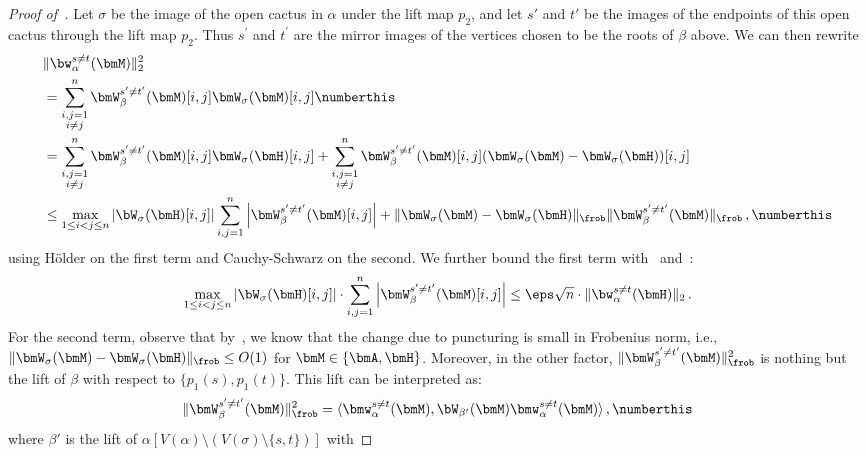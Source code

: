 \begin{proof}[Proof of~]
    Let $\sigma$ be the image of the open cactus in
    $\alpha$ under the lift map $p_2$, and let $s'$ and $t'$ be the images
    of the endpoints of this open cactus through the lift map $p_2$.
    Thus $s^{\prime}$ and $t^{\prime}$ are the mirror images of the vertices chosen to be the roots of $\beta$ above.
     We can then rewrite
    \begin{align*}
        &\|\bw^{s\neq t}_\alpha(\bmM)\|_2^2 \\
        &= \sum_{\substack{i,j=1\\i\neq j}}^n  \bmW_\beta^{s'\neq t'}(\bmM)[i,j] \bmW_\sigma(\bmM)[i,j]\numberthis \label{eq:lift-proof1}\\
            &= \sum_{\substack{i,j=1\\i\neq j}}^n  \bmW_\beta^{s'\neq t'}(\bmM)[i,j]   \bmW_\sigma(\bmH)[i,j] +  \sum_{\substack{i,j=1\\i\neq j}}^n  \bmW_\beta^{s'\neq t'}(\bmM)[i,j]  (\bmW_\sigma(\bmM) - \bmW_\sigma(\bmH))[i,j]\\
            &\le \max_{1\le i<j\le n} \left|\bW_\sigma(\bmH)[i,j]\right| \sum_{i,j=1}^n \left|\bmW_\beta^{s'\neq t'}(\bmM)[i,j]\right| + \|\bmW_\sigma(\bmM) - \bmW_\sigma(\bmH)\|_{\frob}  \|\bmW_\beta^{s'\neq t'}(\bmM)\|_{\frob}\,, \numberthis\label{eq:lift-proof2}
    \end{align*}
    using H{\"o}lder on the first term 
    and Cauchy-Schwarz on the second.
    We further bound the first term with~ and~:
    \[
        \max_{1\le i<j\le n} \left|\bW_\sigma(\bmH)[i,j]\right|\cdot \sum_{i,j=1}^n \left|\bmW_\beta^{s'\neq t'}(\bmM)[i,j]\right|\le \eps \sqrt n \cdot \|\bw_\alpha^{s\neq t}(\bmH)\|_2\,.
    \]
    For the second term, observe that
    by~, we know that
    the change due to puncturing is small in Frobenius norm, i.e.,
    $\|\bmW_\sigma(\bmM) - \bmW_\sigma(\bmH)\|_{\frob}\le O(1)$ for $\bmM\in \{\bmA, \bmH\}$. Moreover, in the other factor,
    $\|\bmW_\beta^{s'\neq t'}(\bmM)\|_{\frob}^2$
    is nothing but the lift of $\beta$ with
    respect to $\{p_1(s), p_1(t)\}$. This lift
    can be interpreted as:
    \begin{align*}
        \|\bmW_\beta^{s'\neq t'}(\bmM)\|_{\frob}^2 = \langle \bmw_\alpha^{s\neq t}(\bmM), \bW_{\beta'} (\bmM) \bmw_\alpha^{s\neq t}(\bmM)\rangle\,, \numberthis\label{eq:lift-proof3}
    \end{align*}
    where $\beta'$ is the lift of 
    $\alpha\left[V(\alpha)\setminus (V(\sigma)\setminus \{s,t\})\right]$ with

\end{proof}
